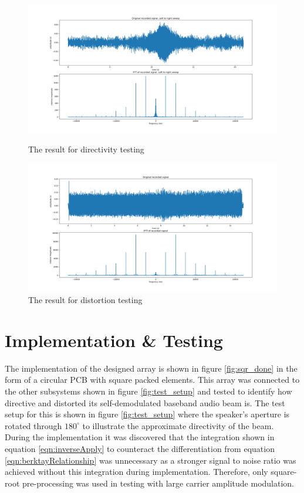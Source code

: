 \documentclass[final,32pt]{beamer}
\begin{document}
\begin{frame}[t]
\begin{multicols}{3}
\begin{figure}[ht!]
    \centering
    \includegraphics[width=\columnwidth]{Figures/Test/original_sig_fft_amp.png}
    \caption{The result for directivity testing}
    \label{fig:test_direct}
    \includegraphics[width=\columnwidth]{Figures/Test/SQRT_fft_sig_straighton.png}
    \caption{The result for distortion testing}
    \label{fig:test_distortion}
\end{figure}



\section{Implementation \& Testing}
The implementation of the designed array is shown in figure \ref{fig:sqr_done} in the form of a circular PCB with square packed elements. This array was connected to the other subsystems shown in figure \ref{fig:test_setup} and tested to identify how directive and distorted its self-demodulated baseband audio beam is. The test setup for this is shown in figure \ref{fig:test_setup} where the speaker's aperture is rotated through $180^\circ$ to illustrate the approximate directivity of the beam. During the implementation it was discovered that the integration shown in equation \ref{eqn:inverseApply} to counteract the differentiation from equation \ref{eqn:berktayRelationship} was unnecessary as a stronger signal to noise ratio was achieved without this integration during implementation. Therefore, only square-root pre-processing was used in testing with large carrier amplitude modulation.

\end{multicols}
\end{frame}
\end{document}
